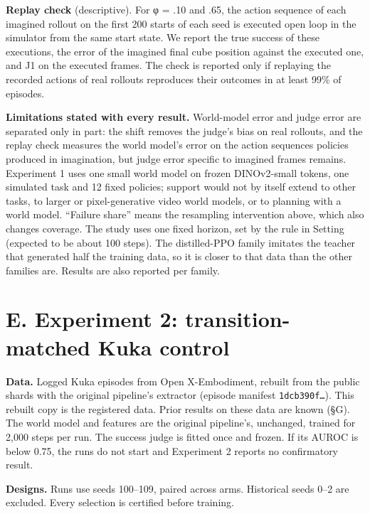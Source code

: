 \documentclass[10pt,letterpaper]{article}
\begin{document}
\textbf{Replay check} (descriptive). For φ = .10 and .65,
the action sequence of each imagined rollout on the first
200 starts of each seed is executed open loop in the
simulator from the same start state. We report the true
success of these executions, the error of the imagined final
cube position against the executed one, and J1 on the
executed frames. The check is reported only if replaying the
recorded actions of real rollouts reproduces their outcomes
in at least 99\% of episodes.

\textbf{Limitations stated with every result.} World-model
error and judge error are separated only in part: the shift
removes the judge's bias on real rollouts, and the replay
check measures the world model's error on the action
sequences policies produced in imagination, but judge error
specific to imagined frames remains. Experiment 1 uses one
small world model on frozen DINOv2-small tokens, one
simulated task and 12 fixed policies; support would not by
itself extend to other tasks, to larger or pixel-generative
video world models, or to planning with a world model.
``Failure share'' means the resampling intervention above,
which also changes coverage. The study uses one fixed
horizon, set by the rule in Setting (expected to be about
100 steps). The distilled-PPO family imitates the teacher
that generated half the training data, so it is closer to
that data than the other families are. Results are also
reported per family.

\hypertarget{e.-experiment-2-transition-matched-kuka-control}{%
\section{E. Experiment 2: transition-matched Kuka
control}\label{e.-experiment-2-transition-matched-kuka-control}}

\textbf{Data.} Logged Kuka episodes from Open X-Embodiment,
rebuilt from the public shards with the original pipeline's
extractor (episode manifest \texttt{1dcb390f…}). This
rebuilt copy is the registered data. Prior results on these
data are known (§G). The world model and features are the
original pipeline's, unchanged, trained for 2,000 steps per
run. The success judge is fitted once and frozen. If its
AUROC is below 0.75, the runs do not start and Experiment 2
reports no confirmatory result.

\textbf{Designs.} Runs use seeds 100--109, paired across
arms. Historical seeds 0--2 are excluded. Every selection is
certified before training.
\end{document}
